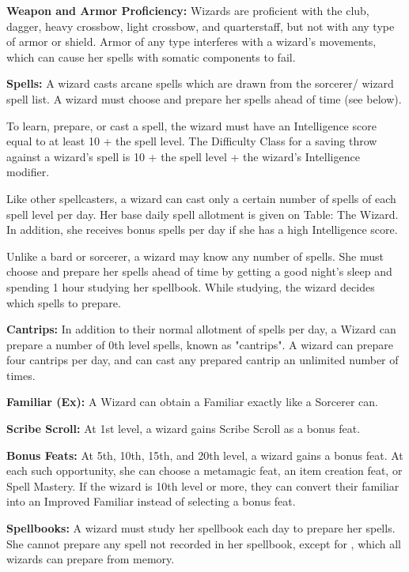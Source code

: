 \classfeatures

\textbf{Weapon and Armor Proficiency:} Wizards are proficient with the club, dagger, heavy crossbow, light crossbow, and quarterstaff, but not with any type of armor or shield. Armor of any type interferes with a wizard's movements, which can cause her spells with somatic components to fail.

\textbf{Spells:} A wizard casts arcane spells which are drawn from the sorcerer/ wizard spell list. A wizard must choose and prepare her spells ahead of time (see below).

To learn, prepare, or cast a spell, the wizard must have an Intelligence score equal to at least 10 + the spell level. The Difficulty Class for a saving throw against a wizard's spell is 10 + the spell level + the wizard's Intelligence modifier.

Like other spellcasters, a wizard can cast only a certain number of spells of each spell level per day. Her base daily spell allotment is given on Table: The Wizard. In addition, she receives bonus spells per day if she has a high Intelligence score.

Unlike a bard or sorcerer, a wizard may know any number of spells. She must choose and prepare her spells ahead of time by getting a good night's sleep and spending 1 hour studying her spellbook. While studying, the wizard decides which spells to prepare.

\textbf{Cantrips:} In addition to their normal allotment of spells per day, a Wizard can prepare a number of 0th level spells, known as "cantrips". A wizard can prepare four cantrips per day, and can cast any prepared cantrip an unlimited number of times.

\textbf{Familiar (Ex):} A Wizard can obtain a Familiar exactly like a Sorcerer can.

\textbf{Scribe Scroll:} At 1st level, a wizard gains Scribe Scroll as a bonus feat.

\textbf{Bonus Feats:} At 5th, 10th, 15th, and 20th level, a wizard gains a bonus feat. At each such opportunity, she can choose a metamagic feat, an item creation feat, or Spell Mastery. If the wizard is 10th level or more, they can convert their familiar into an Improved Familiar instead of selecting a bonus feat.

\textbf{Spellbooks:} A wizard must study her spellbook each day to prepare her spells. She cannot prepare any spell not recorded in her spellbook, except for , which all wizards can prepare from memory.

